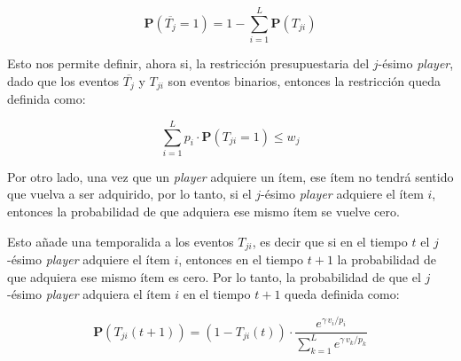 \begin{equation}
  \mathbf{P}(\overline{T_{j}}=1) = 1 - \sum_{i=1}^{L} \mathbf{P}(T_{ji})
\end{equation}

Esto nos permite definir, ahora si, la restricción presupuestaria del $j$-ésimo \textit{player}, dado que los eventos 
$\overline{T_{j}}$ y $T_{ji}$ son eventos binarios, entonces la restricción queda definida como:
\vspace{0.25cm}

\begin{equation}
  \sum_{i=1}^{L} p_i \cdot \mathbf{P}(T_{ji}=1) \leq w_j
\end{equation}
\vspace{0.25cm}

Por otro lado, una vez que un \textit{player} adquiere un ítem, ese ítem no tendrá sentido que vuelva a ser adquirido,
por lo tanto, si el $j$-ésimo \textit{player} adquiere el ítem $i$, entonces la probabilidad de que adquiera ese mismo ítem
se vuelve cero.
\vspace{0.25cm}

Esto añade una temporalida a los eventos $T_{ji}$, es decir que si en el tiempo $t$ el $j$-ésimo \textit{player} adquiere el ítem
$i$, entonces en el tiempo $t+1$ la probabilidad de que adquiera ese mismo ítem es cero. Por lo tanto, la probabilidad de que el $j$-ésimo 
\textit{player} adquiera el ítem $i$ en el tiempo $t+1$ queda definida como:
\vspace{0.25cm}

\begin{equation}
  \mathbf{P}(T_{ji}(t+1)) = (1 - T_{ji}(t)) \cdot \frac{e^{\gamma\, v_i / p_i}}{\sum_{k=1}^{L} e^{\gamma\, v_k / p_k}}
\end{equation}
